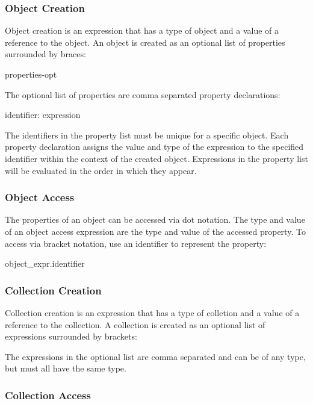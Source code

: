 \documentclass[oneside]{book}
\begin{document}
\subsubsection{Object Creation}

Object creation is an expression that has a type of object and a value of a reference to the object. An object is created as an optional list of properties surrounded by braces:
\begin{code}
{ properties-opt }
\end{code}
The optional list of properties are comma separated property declarations:
\begin{code}
identifier: expression
\end{code}
The identifiers in the property list must be unique for a specific object. Each property declaration assigns the value and type of the expression to the specified identifier within the context of the created object. Expressions in the property list will be evaluated in the order in which they appear.

\subsubsection{Object Access}

The properties of an object can be accessed via dot notation. The type and value of an object access expression are the type and value of the accessed property. To access via bracket notation, use an identifier to represent the property:
\begin{code}
object_expr.identifier
\end{code}

\subsubsection{Collection Creation}

Collection creation is an expression that has a type of colletion and a value of a reference to the collection. A collection is created as an optional list of expressions surrounded by brackets:
\begin{code}
\end{code}
The expressions in the optional list are comma separated and can be of any type, but must all have the same type.

\subsubsection{Collection Access}
\end{document}
